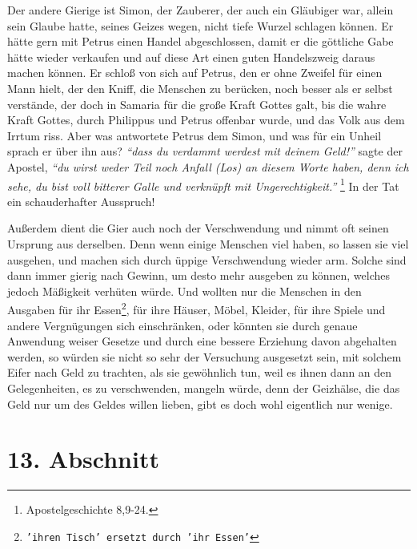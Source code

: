 Der andere Gierige ist Simon, der Zauberer, der auch ein
Gläubiger war, allein
sein Glaube hatte, seines Geizes wegen, nicht tiefe Wurzel schlagen können. Er
hätte gern mit Petrus einen Handel abgeschlossen, damit
er die göttliche Gabe
hätte wieder verkaufen und auf diese Art einen guten Handelszweig daraus machen
können. Er schloß von sich auf Petrus, den er ohne Zweifel für einen Mann hielt,
der den Kniff, die Menschen zu berücken, noch besser als er selbst verstände,
der doch in Samaria für die große Kraft Gottes galt, bis
die wahre Kraft Gottes,
durch Philippus und Petrus offenbar wurde, und das
Volk aus dem Irrtum riss.
Aber was antwortete Petrus dem Simon, und was für ein Unheil sprach er über ihn
aus? \textit{"`dass du verdammt werdest mit deinem Geld!"'} sagte der Apostel,
\textit{"`du wirst
weder Teil noch Anfall (Los) an diesem Worte haben, denn ich sehe, du bist
voll bitterer Galle und verknüpft mit Ungerechtigkeit."'}
\footnote{Apostelgeschichte 8,9-24.}
In der Tat ein schauderhafter Ausspruch!

\medskip

Außerdem dient die Gier auch noch der Verschwendung und
nimmt oft seinen
Ursprung aus derselben. Denn wenn einige Menschen viel haben, so lassen sie viel
ausgehen, und machen sich durch üppige Verschwendung wieder arm. Solche sind
dann immer gierig nach Gewinn, um desto mehr ausgeben zu können, welches jedoch
Mäßigkeit verhüten würde. Und wollten nur die Menschen in den Ausgaben für ihr
Essen\footnote{\texttt{'ihren Tisch' ersetzt durch 'ihr Essen'}}, für ihre
Häuser, Möbel, Kleider, für ihre
Spiele und andere Vergnügungen
sich einschränken, oder könnten sie durch genaue Anwendung weiser Gesetze und
durch eine bessere Erziehung davon abgehalten werden, so würden
sie nicht so
sehr der Versuchung ausgesetzt sein, mit solchem Eifer nach
Geld zu trachten,
als sie gewöhnlich tun, weil es ihnen dann an den
Gelegenheiten, es zu
verschwenden, mangeln würde, denn der Geizhälse, die das Geld nur um des Geldes
willen lieben, gibt es doch wohl eigentlich nur wenige.

\section{13. Abschnitt} \label{kap13_ab13}

